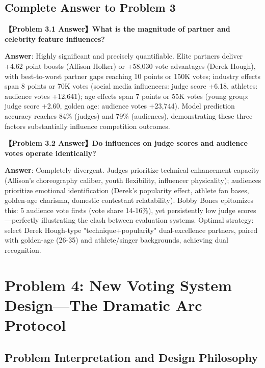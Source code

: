 \subsection{Complete Answer to Problem 3}

\begin{answerbox}
\noindent\textbf{【Problem 3.1 Answer】What is the magnitude of partner and celebrity feature influences?}

\textbf{Answer}: Highly significant and precisely quantifiable. Elite partners deliver +4.62 point boosts (Allison Holker) or +58,030 vote advantages (Derek Hough), with best-to-worst partner gaps reaching 10 points or 150K votes; industry effects span 8 points or 70K votes (social media influencers: judge score +6.18, athletes: audience votes +12,641); age effects span 7 points or 55K votes (young group: judge score +2.60, golden age: audience votes +23,744). Model prediction accuracy reaches 84\% (judges) and 79\% (audiences), demonstrating these three factors substantially influence competition outcomes.
\end{answerbox}

\vspace{0.5em}

\begin{answerbox}
\noindent\textbf{【Problem 3.2 Answer】Do influences on judge scores and audience votes operate identically?}

\textbf{Answer}: Completely divergent. Judges prioritize technical enhancement capacity (Allison's choreography caliber, youth flexibility, influencer physicality); audiences prioritize emotional identification (Derek's popularity effect, athlete fan bases, golden-age charisma, domestic contestant relatability). Bobby Bones epitomizes this: 5 audience vote firsts (vote share 14-16\%), yet persistently low judge scores---perfectly illustrating the clash between evaluation systems. Optimal strategy: select Derek Hough-type "technique+popularity" dual-excellence partners, paired with golden-age (26-35) and athlete/singer backgrounds, achieving dual recognition.
\end{answerbox}

\section{Problem 4: New Voting System Design---The Dramatic Arc Protocol}

\subsection{Problem Interpretation and Design Philosophy}


